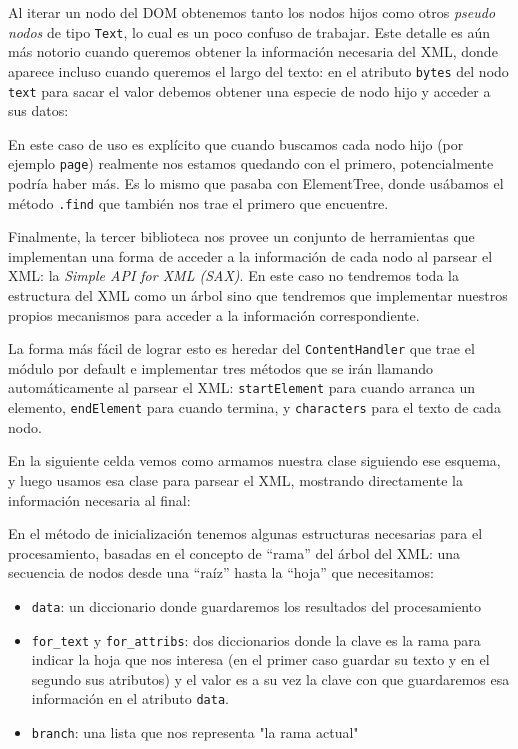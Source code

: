Al iterar un nodo del DOM obtenemos tanto los nodos hijos como otros \textit{pseudo nodos} de tipo \texttt{Text}, lo cual es un poco confuso de trabajar. Este detalle es aún más notorio cuando queremos obtener la información necesaria del XML, donde aparece incluso cuando queremos el largo del texto: en el atributo \texttt{bytes} del nodo \texttt{text} para sacar el valor debemos obtener una especie de nodo hijo y acceder a sus datos:


En este caso de uso es explícito que cuando buscamos cada nodo hijo (por ejemplo \texttt{page}) realmente nos estamos quedando con el primero, potencialmente podría haber más. Es lo mismo que pasaba con ElementTree, donde usábamos el método \texttt{.find} que también nos trae el primero que encuentre.

Finalmente, la tercer biblioteca nos provee un conjunto de herramientas que implementan una forma de acceder a la información de cada nodo al parsear el XML: la \textit{Simple API for XML (SAX)}. En este caso no tendremos toda la estructura del XML como un árbol sino que tendremos que implementar nuestros propios mecanismos para acceder a la información correspondiente.

La forma más fácil de lograr esto es heredar del \texttt{ContentHandler} que trae el módulo por default e implementar tres métodos que se irán llamando automáticamente al parsear el XML: \texttt{startElement} para cuando arranca un elemento, \texttt{endElement} para cuando termina, y \texttt{characters} para el texto de cada nodo.

En la siguiente celda vemos como armamos nuestra clase siguiendo ese esquema, y luego usamos esa clase para parsear el XML, mostrando directamente la información necesaria al final:


En el método de inicialización tenemos algunas estructuras necesarias para el procesamiento, basadas en el concepto de ``rama'' del árbol del XML: una secuencia de nodos desde una ``raíz'' hasta la ``hoja'' que necesitamos:

\begin{itemize}
    \item \texttt{data}: un diccionario donde guardaremos los resultados del procesamiento
    \item \texttt{for\_text} y \texttt{for\_attribs}: dos diccionarios donde la clave es la rama para indicar la hoja que nos interesa (en el primer caso guardar su texto y en el segundo sus atributos) y el valor es a su vez la clave con que guardaremos esa información en el atributo \texttt{data}.
    \item \texttt{branch}: una lista que nos representa "la rama actual"
\end{itemize}

